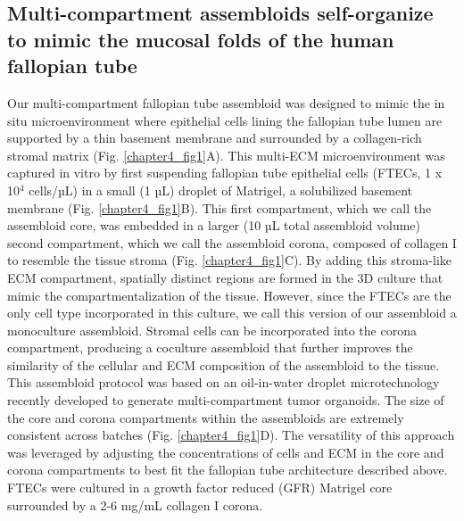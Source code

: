 \begin{refsection}
    \subsection{Multi-compartment assembloids self-organize to mimic the mucosal folds of the human fallopian tube}
    Our multi-compartment fallopian tube assembloid was designed to mimic the in situ microenvironment where epithelial cells lining the fallopian tube lumen are supported by a thin basement membrane and surrounded by a collagen-rich stromal matrix (Fig. \ref{chapter4_fig1}A). This multi-ECM microenvironment was captured in vitro by first suspending fallopian tube epithelial cells (FTECs, 1 x 10$^4$ cells/µL) in a small (1 µL) droplet of Matrigel, a solubilized basement membrane (Fig. \ref{chapter4_fig1}B). This first compartment, which we call the assembloid core, was embedded in a larger (10 µL total assembloid volume) second compartment, which we call the assembloid corona, composed of collagen I to resemble the tissue stroma (Fig. \ref{chapter4_fig1}C). By adding this stroma-like ECM compartment, spatially distinct regions are formed in the 3D culture that mimic the compartmentalization of the tissue. However, since the FTECs are the only cell type incorporated in this culture, we call this version of our assembloid a monoculture assembloid. Stromal cells can be incorporated into the corona compartment, producing a coculture assembloid that further improves the similarity of the cellular and ECM composition of the assembloid to the tissue. This assembloid protocol was based on an oil-in-water droplet microtechnology recently developed to generate multi-compartment tumor organoids\cite{lee2022a}. The size of the core and corona compartments within the assembloids are extremely consistent across batches (Fig. \ref{chapter4_fig1}D). The versatility of this approach was leveraged by adjusting the concentrations of cells and ECM in the core and corona compartments to best fit the fallopian tube architecture described above. FTECs were cultured in a growth factor reduced (GFR) Matrigel core surrounded by a 2-6 mg/mL collagen I corona. 

\end{refsection}
